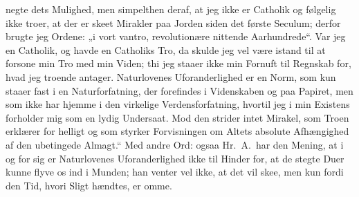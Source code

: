 negte dets Mulighed, men simpelthen deraf, at jeg ikke er Catholik og
følgelig ikke troer, at der er skeet Mirakler paa Jorden siden det første
Seculum; derfor brugte jeg Ordene: „i vort vantro, revolutionære nittende
Aarhundrede“. Var jeg en Catholik, og havde en Catholiks Tro, da skulde jeg vel
være istand til at forsone min Tro med min Viden; thi jeg staaer ikke min
Fornuft til Regnskab for, hvad jeg troende antager. Naturlovenes
Uforanderlighed er en Norm, som kun staaer fast i en Naturforfatning, der
forefindes i Videnskaben og paa Papiret, men som ikke har hjemme i den
virkelige Verdensforfatning, hvortil jeg i min Existens forholder mig som en
lydig Undersaat. Mod den strider intet Mirakel, som Troen erklærer for helligt
og som styrker Forvisningen om Altets absolute Afhængighed af den ubetingede
Almagt.“ Med andre Ord: ogsaa Hr.\ A.\ har den Mening, at i og for sig er
Naturlovenes Uforanderlighed ikke til Hinder for, at de stegte Duer kunne flyve
os ind i Munden; han venter vel ikke, at det vil skee, men kun fordi den Tid,
hvori Sligt hændtes, er omme.

